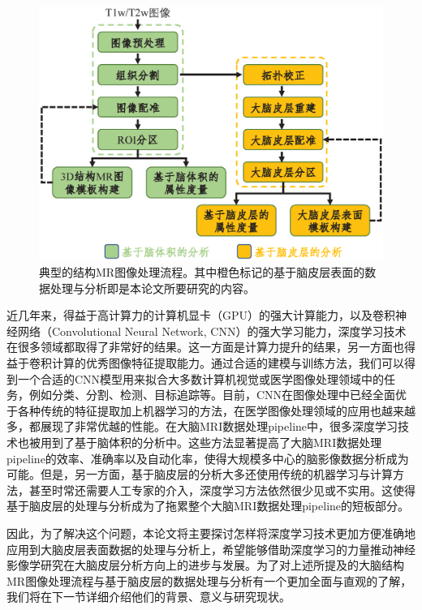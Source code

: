 \begin{figure}[t]
    \centering
    \includegraphics[width=.8\linewidth]{figure/flowchart_of_MRI_process_pipeline.eps}
    \caption{\label{fig:flowchart_of_MRI_process_pipeline}典型的结构MR图像处理流程。其中橙色标记的基于脑皮层表面的数据处理与分析即是本论文所要研究的内容。}
\end{figure}

近几年来，得益于高计算力的计算机显卡（GPU）的强大计算能力，以及卷积神经网络（Convolutional Neural Network, CNN）的强大学习能力，深度学习技术\cite{goodfellow2016deep}在很多领域都取得了非常好的结果。这一方面是计算力提升的结果，另一方面也得益于卷积计算的优秀图像特征提取能力。通过合适的建模与训练方法，我们可以得到一个合适的CNN模型用来拟合大多数计算机视觉或医学图像处理领域中的任务，例如分类、分割、检测、目标追踪等。目前，CNN在图像处理中已经全面优于各种传统的特征提取加上机器学习的方法，在医学图像处理领域的应用也越来越多，都展现了非常优越的性能\cite{shen2017deep,litjens2017survey}。在大脑MRI数据处理pipeline中，很多深度学习技术也被用到了基于脑体积的分析中\cite{li2019computational}。这些方法显著提高了大脑MRI数据处理pipeline的效率、准确率以及自动化率，使得大规模多中心的脑影像数据分析成为可能。但是，另一方面，基于脑皮层的分析大多还使用传统的机器学习与计算方法，甚至时常还需要人工专家的介入，深度学习方法依然很少见或不实用。这使得基于脑皮层的处理与分析成为了拖累整个大脑MRI数据处理pipeline的短板部分。

因此，为了解决这个问题，本论文将主要探讨怎样将深度学习技术更加方便准确地应用到大脑皮层表面数据的处理与分析上，希望能够借助深度学习的力量推动神经影像学研究在大脑皮层分析方向上的进步与发展。为了对上述所提及的大脑结构MR图像处理流程与基于脑皮层的数据处理与分析有一个更加全面与直观的了解，我们将在下一节详细介绍他们的背景、意义与研究现状。


